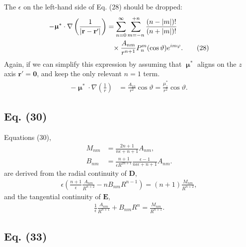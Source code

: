 \documentclass[11pt]{article}
\newcommand{\vct}[1]{\boldsymbol{\mathbf{#1}}}
\newcommand{\vr}{\vct{r}}
\newcommand{\vmu}{\vct{\upmu}}
\begin{document}
The $\epsilon$ on the left-hand side of Eq. (28)
should be dropped:
\begin{align}
  -\vct\upmu^*\cdot
  \nabla
  \left(
    \frac { 1 }
    { |\vr - \vr'| }
  \right)
&=
  \sum_{n = 0}^\infty
  \sum_{m = -n}^{+n}
  \frac { ( n - |m| )! } { ( n + |m| )! }
  \notag
  \\
&\hphantom{=}\times
  \frac { A_{nm} } { r^{n + 1} }
  P_n^m(\cos\vartheta) e^{im \varphi}.
  \tag{28}
\end{align}
%
Again, if we can simplify this expression
by assuming that $\vmu^*$ aligns on the $z$ axis
$\vr' = \vct 0$, and keep the only relevant $n = 1$ term.
%
\begin{align}
  -\vct\upmu^*\cdot
  \nabla
  \left(
    \frac { 1 }
    { r }
  \right)
&=
  \frac { A_{10} } { r^2 }
  \cos\vartheta
=
  \frac { \mu_z^* } { r^2 }
  \cos\vartheta.
  \tag{$28''$}
\end{align}



\subsection{Eq. (30)}


Equations (30),
\begin{equation}
\begin{split}
  M_{nm}
&=
  \frac{ 2 n + 1 } { n \epsilon + n + 1 } A_{nm},
\\
  B_{nm}
&=
  \frac{ n + 1 }{ \epsilon R^{2 n + 1} }
  \frac{ \epsilon - 1 } { n \epsilon \epsilon + n + 1 }
  A_{nm}.
\end{split}
  \tag{30}
\end{equation}
%
are derived from the radial continuity of $\vct D$,
%
\begin{align*}
  \epsilon
  \left(
    \frac { n + 1 }{ \epsilon }
    \frac { A_{nm} } { R^{n+2} }
  - n B_{nm} R^{n - 1}
  \right)
=
  (n + 1) \frac{ M_{nm} }{ R^{n+2} },
\end{align*}
and the tangential continuity of $\vct E$,
\begin{align*}
  \frac { 1 }{ \epsilon }
  \frac { A_{nm} } { R^{n+1} }
+
  B_{nm} R^n
=
  \frac{ M_{nm} }{ R^{n+1} }.
\end{align*}



\subsection{Eq. (33)}
\end{document}
